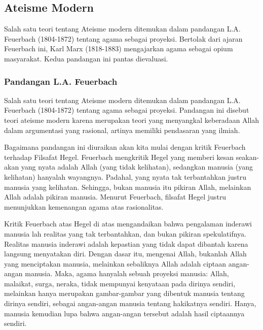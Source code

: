 \documentclass[10pt,a4paper]{article}
\renewenvironment{quote}
{\list{}{%
       \leftmargin 1.5em 
       \rightmargin 0em}
   \item\relax}
{\endlist}
\begin{document}
\begin{multicols}{2}
\hypertarget{ateisme-modern}{%
\subsection{Ateisme Modern}\label{ateisme-modern}}

\begin{quote}
Salah satu teori tentang Ateisme modern ditemukan dalam pandangan L.A.
Feuerbach (1804-1872) tentang agama sebagai proyeksi. Bertolak dari
ajaran Feuerbach ini, Karl Marx (1818-1883) mengajarkan agama sebagai
opium masyarakat. Kedua pandangan ini pantas dievaluasi.
\end{quote}

\hypertarget{pandangan-l.a.-feuerbach}{%
\subsubsection{Pandangan L.A.
Feuerbach}\label{pandangan-l.a.-feuerbach}}

Salah satu teori tentang Ateisme modern ditemukan dalam pandangan L.A.
Feuerbach (1804-1872) tentang agama sebagai proyeksi. Pandangan ini
disebut teori ateisme modern karena merupakan teori yang menyangkal
keberadaan Allah dalam argumentasi yang rasional, artinya memiliki
pendasaran yang ilmiah.

Bagaimana pandangan ini diuraikan akan kita mulai dengan kritik
Feuerbach terhadap Filsafat Hegel. Feuerbach mengkritik Hegel yang
memberi kesan seakan-akan yang nyata adalah Allah (yang tidak
kelihatan), sedangkan manusia (yang kelihatan) hanyalah wayangnya.
Padahal, yang nyata tak terbantahkan justru manusia yang kelihatan.
Sehingga, bukan manusia itu pikiran Allah, melainkan Allah adalah
pikiran manusia. Menurut Feuerbach, filsafat Hegel justru menunjukkan
kemenangan agama atas rasionalitas.

Kritik Feuerbach atas Hegel di atas mengandaikan bahwa pengalaman
inderawi manusia lah realitas yang tak terbantahkan, dan bukan pikiran
spekulatifnya. Realitas manusia inderawi adalah kepastian yang tidak
dapat dibantah karena langsung menyatakan diri. Dengan dasar itu,
mengenai Allah, bukanlah Allah yang menciptakan manusia, melainkan
sebaliknya Allah adalah ciptaan angan-angan manusia. Maka, agama
hanyalah sebuah proyeksi manusia: Allah, malaikat, surga, neraka, tidak
mempunyai kenyataan pada dirinya sendiri, melainkan hanya merupakan
gambar-gambar yang dibentuk manusia tentang dirinya sendiri, sebagai
angan-angan manusia tentang hakikatnya sendiri. Hanya, manusia kemudian
lupa bahwa angan-angan tersebut adalah hasil ciptaannya sendiri.


\end{multicols}
\end{document}

